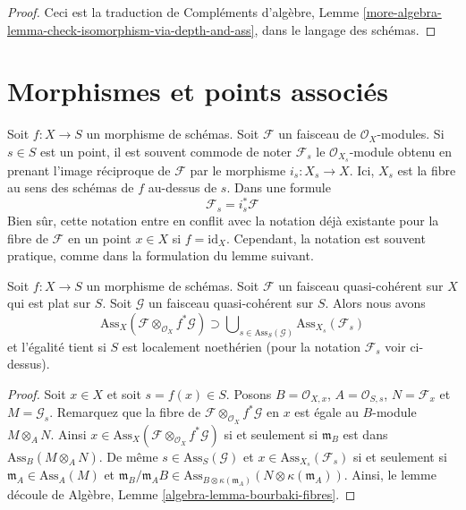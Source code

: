 \begin{proof}
Ceci est la traduction de Compléments d'algèbre, Lemme  \ref{more-algebra-lemma-check-isomorphism-via-depth-and-ass}, dans le langage des
schémas.
\end{proof}




\section{Morphismes et points associés}
\label{section-morphisms-associated}

\noindent
Soit  $f : X \to S$  un morphisme de schémas. Soit  $\mathcal{F}$  un faisceau de
 $\mathcal{O}_X$-modules. Si  $s \in S$  est un point, il est souvent commode de
noter  $\mathcal{F}_s$  le  $\mathcal{O}_{X_s}$-module obtenu en prenant l'image réciproque de
 $\mathcal{F}$  par le morphisme  $i_s : X_s \to X$. Ici,  $X_s$  est la fibre au sens
des schémas de  $f$  au-dessus de  $s$. Dans une formule
$$
\mathcal{F}_s = i_s^*\mathcal{F}
$$
Bien sûr, cette notation entre en conflit avec la notation déjà existante pour la
fibre de  $\mathcal{F}$  en un point  $x \in X$  si  $f = \text{id}_X$. Cependant, la
notation est souvent pratique, comme dans la formulation du lemme suivant.

\begin{lemma}
\label{lemma-bourbaki}
Soit  $f : X \to S$  un morphisme de schémas. Soit  $\mathcal{F}$  un faisceau
quasi-cohérent sur  $X$  qui est plat sur  $S$. Soit  $\mathcal{G}$ 
un faisceau quasi-cohérent sur  $S$. Alors nous avons
$$
\text{Ass}_X(\mathcal{F} \otimes_{\mathcal{O}_X} f^*\mathcal{G})
\supset
\bigcup\nolimits_{s \in \text{Ass}_S(\mathcal{G})}
\text{Ass}_{X_s}(\mathcal{F}_s)
$$
et l'égalité tient si  $S$  est localement noethérien (pour la notation
 $\mathcal{F}_s$  voir ci-dessus).
\end{lemma}

\begin{proof}
Soit  $x \in X$  et soit  $s = f(x) \in S$. Posons  $B = \mathcal{O}_{X, x}$,  $A = \mathcal{O}_{S, s}$,
 $N = \mathcal{F}_x$ et  $M = \mathcal{G}_s$. Remarquez que la fibre de  $\mathcal{F} \otimes_{\mathcal{O}_X} f^*\mathcal{G}$  en
 $x$  est égale au  $B$-module  $M \otimes_A N$. Ainsi  $x \in \text{Ass}_X(\mathcal{F} \otimes_{\mathcal{O}_X} f^*\mathcal{G})$  si
et seulement si  $\mathfrak m_B$  est dans  $\text{Ass}_B(M \otimes_A N)$. De même  $s \in \text{Ass}_S(\mathcal{G})$  et
 $x \in \text{Ass}_{X_s}(\mathcal{F}_s)$  si et seulement si  $\mathfrak m_A \in \text{Ass}_A(M)$  et  $\mathfrak m_B/\mathfrak m_A B \in
\text{Ass}_{B \otimes \kappa(\mathfrak m_A)}(N \otimes \kappa(\mathfrak m_A))$. Ainsi, le lemme
découle de Algèbre, Lemme  \ref{algebra-lemma-bourbaki-fibres}.
\end{proof}





